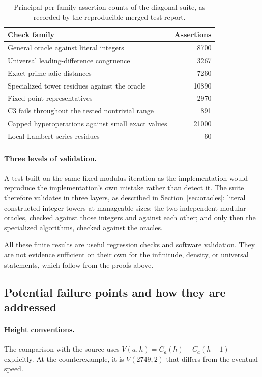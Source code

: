 \documentclass[11pt,letterpaper]{article}
\numberwithin{equation}{section}
\theoremstyle{definition}
\theoremstyle{remark}
\begin{document}
\begin{table}[htbp]
\centering
\caption{Principal per-family assertion counts of the diagonal suite, as recorded by the reproducible merged test report.}\label{tab:donorcounts}
\begin{tabular}{lr}
\toprule
Check family&Assertions\\
\midrule
General oracle against literal integers&8700\\
Universal leading-difference congruence&3267\\
Exact prime-adic distances&7260\\
Specialized tower residues against the oracle&10890\\
Fixed-point representatives&2970\\
C3 fails throughout the tested nontrivial range&891\\
Capped hyperoperations against small exact values&21000\\
Local Lambert-series residues&60\\
\bottomrule
\end{tabular}
\end{table}

\paragraph{Three levels of validation.}
A test built on the same fixed-modulus iteration as the implementation would reproduce the implementation's own mistake rather than detect it. The suite therefore validates in three layers, as described in Section~\ref{sec:oracles}: literal constructed integer towers at manageable sizes; the two independent modular oracles, checked against those integers and against each other; and only then the specialized algorithms, checked against the oracles.

All these finite results are useful regression checks and software validation. They are not evidence sufficient on their own for the infinitude, density, or universal statements, which follow from the proofs above.

\subsection{Potential failure points and how they are addressed}

\paragraph{Height conventions.}
The comparison with the source uses $V(a,h)=C_a(h)-C_a(h-1)$ explicitly. At the counterexample, it is $V(2749,2)$ that differs from the eventual speed.
\end{document}
